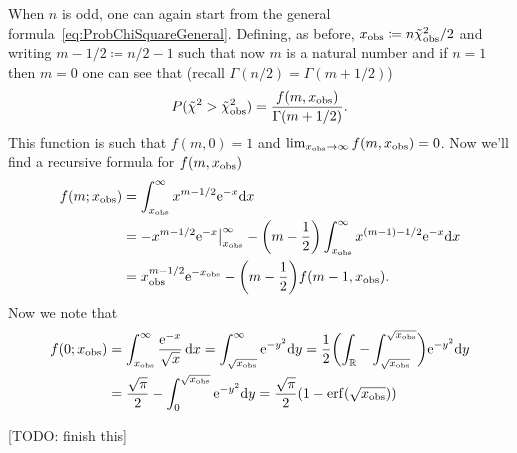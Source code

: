 When $n$ is odd, one can again start from the general formula~\eqref{eq:ProbChiSquareGeneral}.
Defining, as before, $x_\textup{obs} \coloneqq n\tilde\chi^2_\textup{obs}/2$ and writing $m -1/2\coloneqq n/2-1$ such that now $m$ is a natural number and if $n=1$ then $m=0$ one can see that (recall $\Gamma(n/2) = \Gamma(m+1/2)$)
\begin{equation}
	P(\tilde\chi^2>\tilde\chi^2_\textup{obs}) = \frac{f(m,x_\textup{obs})}{\Gamma(m+1/2)}.
\end{equation}
This function is such that $f(m,0) = 1$ and $\lim_{x_\textup{obs}\to\infty}f(m,x_\textup{obs}) = 0$.
Now we'll find a recursive formula for $f(m,x_\textup{obs})$
\begin{equation}
	\begin{aligned}
		f(m;x_\textup{obs})
		&=  \int_{x_\textup{obs}}^\infty x^{m-1/2}\mathrm{e}^{-x}\!\mathop{}\!\mathrm{d} x\\
  &= -x^{m-1/2}\mathrm{e}^{-x}\big\rvert_{x_\textup{obs}}^\infty - \biggl(m-\frac{1}{2}\biggr) \int_{x_\textup{obs}}^\infty x^{(m-1)-1/2}\mathrm{e}^{-x}\!\mathop{}\!\mathrm{d} x\\
  &= x_\textup{obs}^{m-1/2}\mathrm{e}^{-x_\textup{obs}}- \biggl(m-\frac{1}{2}\biggr) f(m-1,x_\textup{obs}).
	\end{aligned}
\end{equation}
Now we note that
\begin{equation}
	\begin{aligned}
		f(0;x_\textup{obs})
		&=  \int_{x_\textup{obs}}^\infty \frac{\mathrm{e}^{-x}}{\sqrt{x}}\mathop{}\!\mathrm{d} x
		=  \int_{\sqrt{x_\textup{obs}}}^\infty \mathrm{e}^{-y^2}\!\mathop{}\!\mathrm{d} y
		= \frac{1}{2}\biggl(\int_{\mathbb{R}} - \int_{\sqrt{x_\textup{obs}}}^{\sqrt{x_\textup{obs}}}\biggr) \mathrm{e}^{-y^2}\!\mathop{}\!\mathrm{d} y\\
		&= \frac{\sqrt{\pi}}{2} - \int_0^{\sqrt{x_\textup{obs}}}\mathrm{e}^{-y^2}\!\mathop{}\!\mathrm{d} y
		=  \frac{\sqrt{\pi}}{2}(1-\operatorname{erf}(\sqrt{x_\textup{obs}}))
	\end{aligned}
\end{equation}

[TODO: finish this]


